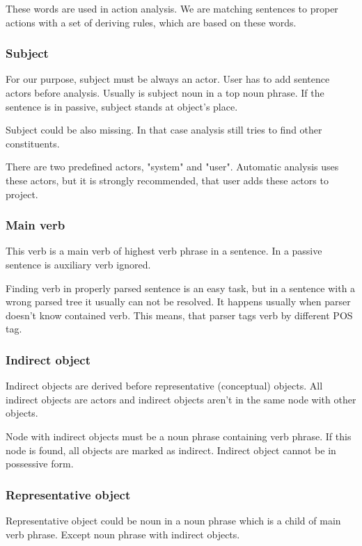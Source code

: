 These words are used in action analysis. We are matching sentences to proper actions with a set of deriving rules, which are based on these words. 
                                                                    
\subsubsection{Subject}
For our purpose, subject must be always an actor. User has to add sentence actors before analysis. Usually is subject noun in a top noun phrase. If the sentence is in passive, subject stands at object's place. 

Subject could be also missing. In that case analysis still tries to find other constituents.

There are two predefined actors, "system" and "user". Automatic analysis uses these actors, but it is strongly recommended, that user adds these actors to project.

\subsubsection{Main verb}
This verb is a main verb of highest verb phrase in a sentence. In a passive sentence is auxiliary verb ignored. 

Finding verb in properly parsed sentence is an easy task, but in a sentence with a wrong parsed tree it usually can not be resolved. It happens usually when parser doesn't know contained verb. This means, that parser tags verb by different POS tag.

\subsubsection{Indirect object}
Indirect objects are derived before representative (conceptual) objects. All indirect objects are actors and indirect objects aren't in the same node with other objects.

Node with indirect objects must be a noun phrase containing verb phrase. If this node is found, all objects are marked as indirect. Indirect object cannot be in possessive form.  

\subsubsection{Representative object}
Representative object could be noun in a noun phrase which is a child of main verb phrase. Except noun phrase with indirect objects.

